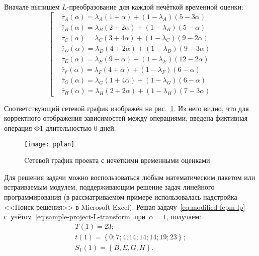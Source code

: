Вначале выпишем $L$-преобразование для каждой нечёткой временной оценки:
\begin{equation}
\label{eq:sample-project-L-transform}
\left[ \begin{aligned}
   & \bar{\tau}_A\left( \alpha \right)=\lambda_A\left( 1+\alpha \right)+\left( 1-\lambda_A \right)\left( 5-3\alpha \right) \\ 
   & \bar{\tau}_B\left( \alpha \right)=\lambda_B\left( 2+2\alpha \right)+\left( 1-\lambda_B \right)\left( 5-\alpha \right) \\ 
   & \bar{\tau}_C\left( \alpha \right)=\lambda_C\left( 3+4\alpha \right)+\left( 1-\lambda_C \right)\left( 9-2\alpha \right) \\ 
   & \bar{\tau}_D\left( \alpha \right)=\lambda_D\left( 4+2\alpha \right)+\left( 1-\lambda_D \right)\left( 9-3\alpha \right) \\ 
   & \bar{\tau}_E\left( \alpha \right)=\lambda_E\left( 9+\alpha \right)+\left( 1-\lambda_E \right)\left( 12-2\alpha \right) \\ 
   & \bar{\tau}_F\left( \alpha \right)=\lambda_F\left( 4+\alpha \right)+\left( 1-\lambda_F \right)\left( 6-\alpha \right) \\ 
   & \bar{\tau}_G\left( \alpha \right)=\lambda_G\left( 1+4\alpha \right)+\left( 1-\lambda_G \right)\left( 6-\alpha \right) \\ 
   & \bar{\tau}_H\left( \alpha \right)=\lambda_H\left( 2+2\alpha \right)+\left( 1-\lambda_H \right)\left( 7-3\alpha \right)
\end{aligned} \right.
\end{equation}

Соответствующий сетевой график изображён на рис.~\ref{fig:pplan}. Из него видно, что для корректного отображения зависимостей между операциями, введена фиктивная операция Ф1 длительностью 0 дней.
\begin{figure}[h!]
  \centering
  {
    \texttt{[image: pplan]}
    \caption{Cетевой график проекта с нечёткими временными оценками}
    \label{fig:pplan}
  }
\end{figure}

Для решения задачи можно воспользоваться любым математическим пакетом или встраиваемым модулем, поддерживающим решение задач линейного программирования (в рассматриваемом примере использовалась надстройка <<Поиск решения>> в Microsoft Excel). Решая задачу~\eqref{eq:modified-fcpm-lp} с~учётом~\eqref{eq:sample-project-L-transform} при~$\alpha=1$, получаем:
\begin{gather*}
  T\left( 1 \right)=23; \\ 
  t\left( 1 \right)=\left\{ 0;7;4;14;14;14;19;23 \right\}; \\ 
  S_1\left( 1 \right)=\left\{ B,E,G,H \right\}.
\end{gather*}

